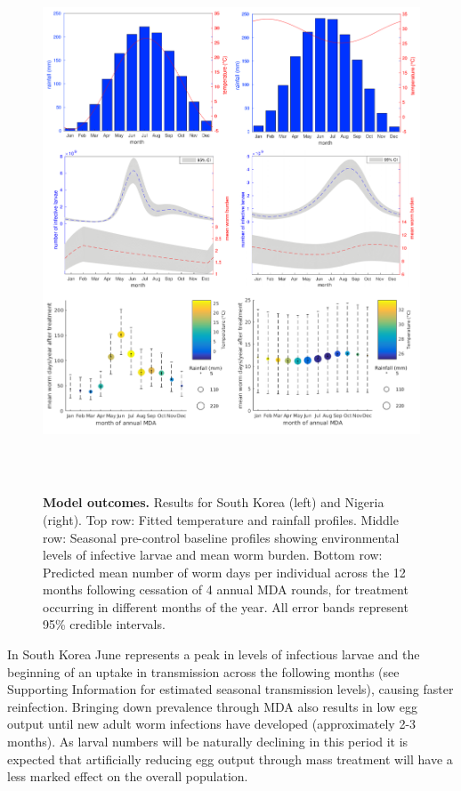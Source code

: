 \begin{figure}[!ht]
\includegraphics[height=16cm]{Project/Figures/STH/Fig5.pdf}
\caption[Epidemiological outcomes by MDA timing.]{{\bf Model outcomes.}
Results for South Korea (left) and Nigeria (right). Top row: Fitted temperature and rainfall profiles. Middle row: Seasonal pre-control baseline profiles showing environmental levels of infective larvae and mean worm burden. Bottom row: Predicted mean number of worm days per individual across the 12 months following cessation of 4 annual MDA rounds, for treatment occurring in different months of the year. All error bands represent 95\% credible intervals.}
\label{Fig5}
\end{figure} 

In South Korea June represents a peak in levels of infectious larvae and the beginning of an uptake in transmission across the following months (see Supporting Information for estimated seasonal transmission levels), causing faster reinfection. Bringing down prevalence through MDA also results in low egg output until new adult worm infections have developed (approximately 2-3 months). As larval numbers will be naturally declining in this period it is expected that artificially reducing egg output through mass treatment will have a less marked effect on the overall population.

